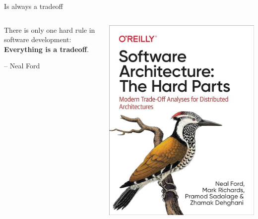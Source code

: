 \begin{frame}{Is always a tradeoff}
\begin{columns}
    \begin{column}{0.6\textwidth}
        \begin{shadequote}
            \hspace{.5cm}
            There is only one hard rule in software development:
            \textbf{Everything is a tradeoff}.

            \vspace{.3cm}

            -- Neal Ford
        \end{shadequote}
    \end{column}
    \begin{column}{0.4\textwidth}
        \includegraphics[width=.8\textwidth]{./assets/software_architecture}
    \end{column}
\end{columns}
\end{frame}
